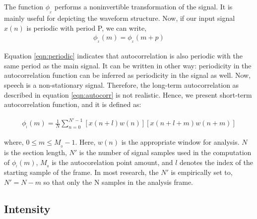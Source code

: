 The function $\phi __x$ performs a noninvertible transformation of the signal. It is mainly useful for depicting the waveform structure. Now, if our input signal $x(n)$ is periodic with period P, we can write, 
\begin{align}
    \phi{__x} (m) = \phi{__x} (m+p)
    \label{eqn:periodic}
\end{align}


Equation \ref{eqn:periodic} indicates that autocorrelation is also periodic with the same period as the main signal. It can be written in other way: periodicity in the autocorrelation function can be inferred as periodicity in the signal as well. Now, speech is a non-stationary signal. Therefore, the long-term autocorrelation as described in equation \ref{eqn:autocorr} is not realistic. Hence, we present short-term autocorrelation function, and it is defined as:


\begin{align}
     \phi{__l} (m)  = \frac{1}{N} \sum_{n=0}^{N'-1}[x(n+l)w(n)][x(n+l+m)w(n+m)]
\end{align}

where, $0\leq m \leq {M__0}  -1$. Here, $w(n)$ is the appropriate window for analysis. $N$ is the
section length,  $N'$ is the number of signal
samples used in the computation of $\phi{__l} (m)$, $M__0$ is the autocorelation point amount, and $l$ denotes the index of the starting sample of the frame. In most research, the $N'$ is empirically set to, $N'= N- m $ so that only the N samples in the analysis frame.



\subsection{Intensity}
\label{intensity}

